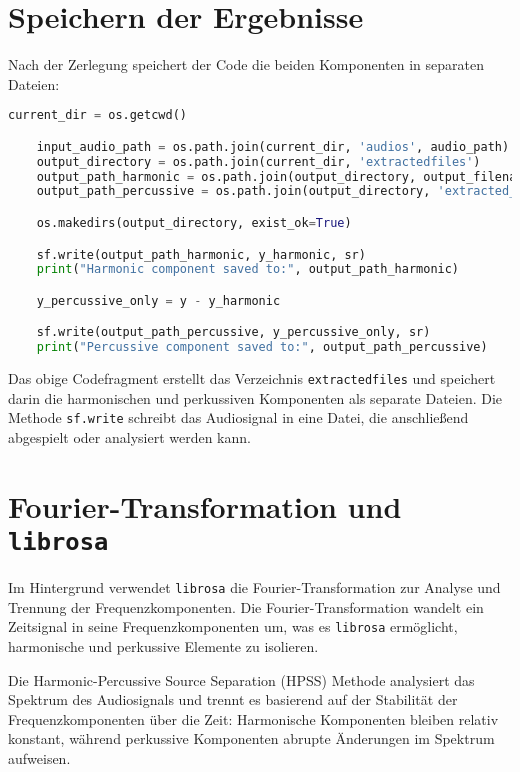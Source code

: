 \section{Speichern der Ergebnisse}

Nach der Zerlegung speichert der Code die beiden Komponenten in separaten Dateien:

\begin{lstlisting}[language=Python, caption={Speichern der Komponenten}]
    current_dir = os.getcwd()

    input_audio_path = os.path.join(current_dir, 'audios', audio_path)
    output_directory = os.path.join(current_dir, 'extractedfiles')
    output_path_harmonic = os.path.join(output_directory, output_filename)
    output_path_percussive = os.path.join(output_directory, 'extracted_percussive.wav')

    os.makedirs(output_directory, exist_ok=True)

    sf.write(output_path_harmonic, y_harmonic, sr)
    print("Harmonic component saved to:", output_path_harmonic)

    y_percussive_only = y - y_harmonic

    sf.write(output_path_percussive, y_percussive_only, sr)
    print("Percussive component saved to:", output_path_percussive)
\end{lstlisting}

Das obige Codefragment erstellt das Verzeichnis \texttt{extractedfiles} und speichert darin die harmonischen und perkussiven Komponenten als separate Dateien. Die Methode \texttt{sf.write} schreibt das Audiosignal in eine Datei, die anschließend abgespielt oder analysiert werden kann.

\section{Fourier-Transformation und \texttt{librosa}}

Im Hintergrund verwendet \texttt{librosa} die Fourier-Transformation zur Analyse und Trennung der Frequenzkomponenten. Die Fourier-Transformation wandelt ein Zeitsignal in seine Frequenzkomponenten um, was es \texttt{librosa} ermöglicht, harmonische und perkussive Elemente zu isolieren.

Die Harmonic-Percussive Source Separation (HPSS) Methode analysiert das Spektrum des Audiosignals und trennt es basierend auf der Stabilität der Frequenzkomponenten über die Zeit: Harmonische Komponenten bleiben relativ konstant, während perkussive Komponenten abrupte Änderungen im Spektrum aufweisen.

